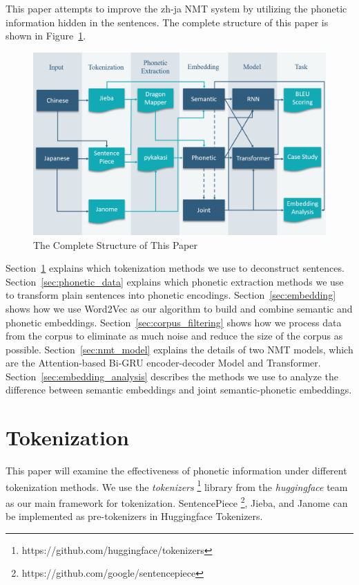 \hspace{24pt}

This paper attempts to improve the zh-ja NMT system by utilizing the phonetic information hidden in the sentences. The complete structure of this paper is shown in Figure~\ref{fig:structure}.

\begin{figure}[h]
	\centering
	\includegraphics[scale=0.6]{../images/structure.png}
    \caption{The Complete Structure of This Paper}
	\label{fig:structure}
\end{figure}

Section~\ref{sec:tokenization} explains which tokenization methods we use to deconstruct sentences. Section~\ref{sec:phonetic_data} explains which phonetic extraction methods we use to transform plain sentences into phonetic encodings. Section~\ref{sec:embedding} shows how we use Word2Vec as our algorithm to build and combine semantic and phonetic embeddings. Section~\ref{sec:corpus_filtering} shows how we process data from the corpus to eliminate as much noise and reduce the size of the corpus as possible. Section~\ref{sec:nmt_model} explains the details of two NMT models, which are the Attention-based Bi-GRU encoder-decoder Model and Transformer. Section~\ref{sec:embedding_analysis} describes the methods we use to analyze the difference between semantic embeddings and joint semantic-phonetic embeddings.

\section{Tokenization} \label{sec:tokenization}

This paper will examine the effectiveness of phonetic information under different tokenization methods. We use the \textit{tokenizers} \footnote{https://github.com/huggingface/tokenizers} library from the \textit{huggingface} team as our main framework for tokenization. SentencePiece \footnote{https://github.com/google/sentencepiece}, Jieba, and Janome can be implemented as pre-tokenizers in Huggingface Tokenizers.

